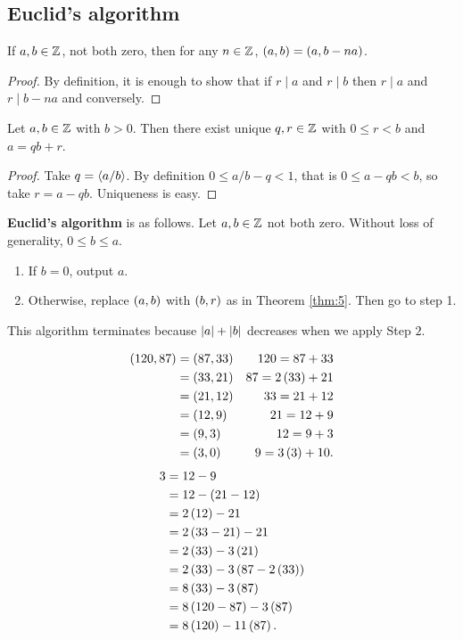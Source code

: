 \subsection{Euclid's algorithm}

\begin{proposition}
If $ a, b \in \mathbb{Z} $, not both zero, then for any $ n \in \mathbb{Z} $, $ \left( a, b \right) = \left( a, b - na \right) $.
\end{proposition}

\begin{proof}
By definition, it is enough to show that if $ r \mid a $ and $ r \mid b $ then $ r \mid a $ and $ r \mid b - na $ and conversely.
\end{proof}

\begin{theorem}
\label{thm:5}
Let $ a, b \in \mathbb{Z} $ with $ b > 0 $. Then there exist unique $ q, r \in \mathbb{Z} $ with $ 0 \le r < b $ and $ a = qb + r $.
\end{theorem}

\begin{proof}
Take $ q = \left\langle a / b \right\rangle $. By definition $ 0 \le a / b - q < 1 $, that is $ 0 \le a - qb < b $, so take $ r = a - qb $. Uniqueness is easy.
\end{proof}

\textbf{Euclid's algorithm} is as follows. Let $ a, b \in \mathbb{Z} $ not both zero. Without loss of generality, $ 0 \le b \le a $.
\begin{enumerate}[leftmargin=0.5in, label=Step \arabic*.]
\item If $ b = 0 $, output $ a $.
\item Otherwise, replace $ \left( a, b \right) $ with $ \left( b, r \right) $ as in Theorem \ref{thm:5}. Then go to step 1.
\end{enumerate}
This algorithm terminates because $ \left\lvert a \right\rvert + \left\lvert b \right\rvert $ decreases when we apply Step $ 2 $.

\begin{example*}
\begin{align*}
\left( 120, 87 \right)
& = \left( 87, 33 \right) & 120 = 87 + 33 \\
& = \left( 33, 21 \right) & 87 = 2\left( 33 \right) + 21 \\
& = \left( 21, 12 \right) & 33 = 21 + 12 \\
& = \left( 12, 9 \right) & 21 = 12 + 9 \\
& = \left( 9, 3 \right) & 12 = 9 + 3 \\
& = \left( 3, 0 \right) & 9 = 3\left( 3 \right) + 10.
\end{align*}
\begin{align*}
3
& = 12 - 9 \\
& = 12 - \left( 21 - 12 \right) \\
& = 2\left( 12 \right) - 21 \\
& = 2\left( 33 - 21 \right) - 21 \\
& = 2\left( 33 \right) - 3\left( 21 \right) \\
& = 2\left( 33 \right) - 3\left( 87 - 2\left( 33 \right) \right) \\
& = 8\left( 33 \right) - 3\left( 87 \right) \\
& = 8\left( 120 - 87 \right) - 3\left( 87 \right) \\
& = 8\left( 120 \right) - 11\left( 87 \right).
\end{align*}
\end{example*}

